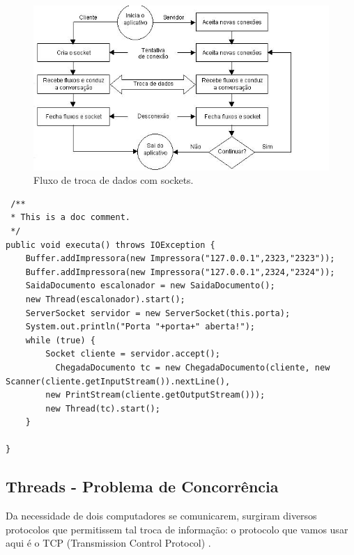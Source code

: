 \documentclass[12pt]{article}
\begin{document}
\begin{figure}[H]
	\centering
	\includegraphics[scale=1]{imagens/fluxoSocket.JPG}
    \caption{Fluxo de troca de dados com sockets.}
	\label{fluxoSocket}
\end{figure}
 \begin{lstlisting}
 /**
 * This is a doc comment.
 */
public void executa() throws IOException {
	Buffer.addImpressora(new Impressora("127.0.0.1",2323,"2323"));
	Buffer.addImpressora(new Impressora("127.0.0.1",2324,"2324"));
	SaidaDocumento escalonador = new SaidaDocumento();
	new Thread(escalonador).start();
	ServerSocket servidor = new ServerSocket(this.porta);
	System.out.println("Porta "+porta+" aberta!");
	while (true) {
		Socket cliente = servidor.accept();
	      ChegadaDocumento tc = new ChegadaDocumento(cliente, new 		 Scanner(cliente.getInputStream()).nextLine(),
		new PrintStream(cliente.getOutputStream()));
		new Thread(tc).start();
	}

}
 \end{lstlisting}
 
\subsection{ Threads -  Problema de Concorrência}
 Da necessidade de dois computadores se comunicarem, surgiram diversos protocolos que permitissem tal troca de informação: o protocolo que vamos usar aqui é o TCP (Transmission Control Protocol) \cite{conc}.
\end{document}
